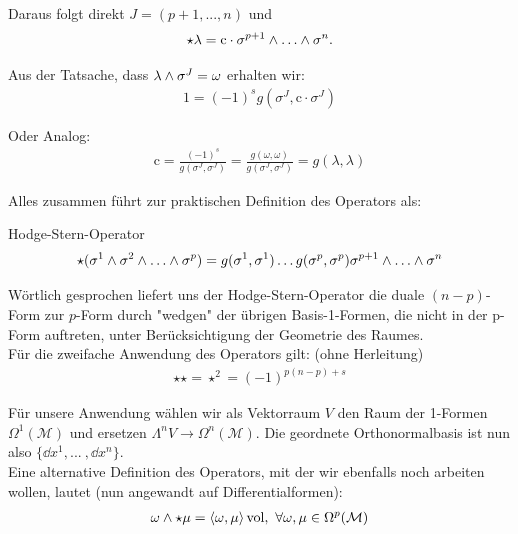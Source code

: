 Daraus folgt direkt $J = (p+1, ..., n)$ und 
\begin{align}
\star\lambda = \text{c} \cdot \sigma^{p+1} \w \dots \w \sigma^n.
\end{align}

Aus der Tatsache, dass $\lambda \wedge \sigma^J = \omega$ erhalten wir:
\begin{align}
1 = (-1)^s g(\sigma^J,\text{c}\cdot\sigma^J)
\end{align}

Oder Analog:
\begin{align}
\text{c}= \frac{(-1)^s}{g(\sigma^J,\sigma^J)} = \frac{g(\omega,\omega)}{g(\sigma^J,\sigma^J)} = g(\lambda,\lambda)
\end{align}

Alles zusammen führt zur praktischen Definition des Operators als:
\begin{mybox}{Hodge-Stern-Operator}
\begin{align}
\star(\sigma^1 \w \sigma^2 \w \dots \w \sigma^p) = g(\sigma^1,\sigma^1)\dots g(\sigma^p,\sigma^p) \sigma^{p+1}\w \dots \w \sigma^n
\end{align}
\end{mybox}


Wörtlich gesprochen liefert uns der Hodge-Stern-Operator die duale $(n-p)$-Form zur $p$-Form durch "wedgen" der übrigen Basis-1-Formen, die nicht in der p-Form auftreten, unter Berücksichtigung der Geometrie des Raumes. \\

 Für die zweifache Anwendung des Operators gilt: (ohne Herleitung)
 \begin{align}
 \star \star = \star^2 = (-1)^{p(n-p)+s}
 \end{align}


Für unsere Anwendung wählen wir als Vektorraum $V$ den Raum der 1-Formen $\Omega^1(\mathcal{M})$ und ersetzen $\Lambda^n V \rightarrow \Omega^n(\mathcal{M})$. Die geordnete Orthonormalbasis ist nun also $\{\dd x^1, ...\ , \dd x^n\}$. \\

Eine alternative Definition des Operators, mit der wir ebenfalls noch arbeiten wollen, lautet (nun angewandt auf Differentialformen):
\begin{align}
\omega \w \star \mu = \left<\omega,\mu \right> \text{vol}, \ \forall \omega, \mu \in \Omega^p(\mathcal{M})
\end{align}

